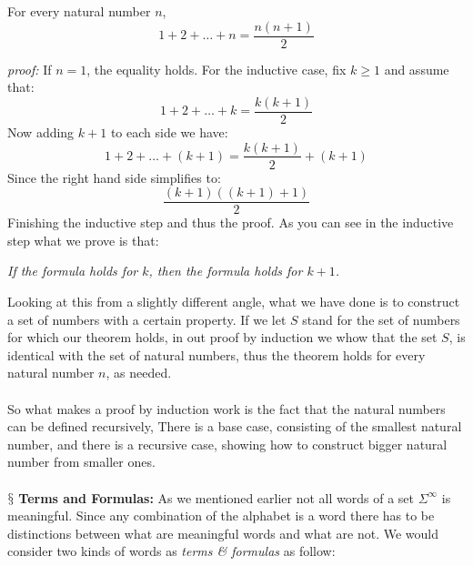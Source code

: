 \documentclass[10pt,a4paper]{article}
\newcounter{theo}
\newcommand{\newpoint}[1]{\indent$\mathsection$ \textbf{#1}}
\begin{document}
                    \begin{theorem}
                        For every natural number $n$,
                        \begin{equation}
                            1+2+\dots + n = \frac{n(n+1)}{2}
                        \end{equation}
                    \end{theorem}
                    \textit{proof:} If $n=1$, the equality holds. For the inductive case, fix $k\geq 1$ and assume that:
                    \begin{equation}
                        1+2+\dots+k =\frac{k(k+1)}{2}
                    \end{equation}
                    Now adding $k+1$ to each side we have:
                    \begin{equation}
                        1+2+\dots+(k+1) = \frac{k(k+1)}{2}+(k+1)
                    \end{equation}
                    Since the right hand side simplifies to:
                    \begin{equation}
                        \frac{(k+1)((k+1) + 1)}{2}
                    \end{equation}
                    Finishing the inductive step and thus the proof. As you can see in the inductive step what we prove is that:
                    \begin{qt}
                        \textit{If the formula holds for $k$, then the formula holds for $k+1$.}
                    \end{qt}
                    Looking at this from a slightly different angle, what we have done is to construct a set of numbers with a certain property. If we let $S$ stand for the set of numbers for which our theorem holds, in out proof by induction we whow that the set $S$, is identical with the set of natural numbers, thus the theorem holds for every natural number $n$, as needed.
                    \\
                    \\
                    So what makes a proof by induction work is the fact that the natural numbers can be defined recursively, There is a base case, consisting of the smallest natural number, and there is a recursive case, showing how to construct bigger natural number from smaller ones.
                    \\
                    \\
                    \newpoint{Terms and Formulas:} As we mentioned earlier not all words of a set $\Sigma^\infty$ is meaningful. Since any combination of the alphabet is a word there has to be distinctions between what are meaningful words and what are not. We would consider two kinds of words as \textit{terms \& formulas} as follow:
\end{document}
